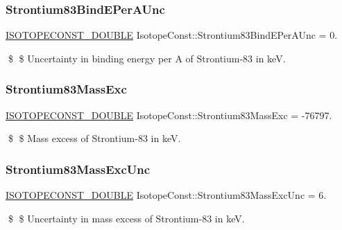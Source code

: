 \subsubsection{\texorpdfstring{Strontium83\+Bind\+E\+Per\+A\+Unc}{Strontium83BindEPerAUnc}}
{\footnotesize\ttfamily \mbox{\hyperlink{group___isotope_const-_macros_ga8f45a7272ce02c0b4c65c44636ed719a}{I\+S\+O\+T\+O\+P\+E\+C\+O\+N\+S\+T\+\_\+\+D\+O\+U\+B\+LE}} Isotope\+Const\+::\+Strontium83\+Bind\+E\+Per\+A\+Unc = 0.}

\$ \$ Uncertainty in binding energy per A of Strontium-\/83 in keV. \mbox{\label{group___isotope_const-_strontium-_sr83_gabb18fc93fcec2e3f7b40bd7cbf25b837}} 
\subsubsection{\texorpdfstring{Strontium83\+Mass\+Exc}{Strontium83MassExc}}
{\footnotesize\ttfamily \mbox{\hyperlink{group___isotope_const-_macros_ga8f45a7272ce02c0b4c65c44636ed719a}{I\+S\+O\+T\+O\+P\+E\+C\+O\+N\+S\+T\+\_\+\+D\+O\+U\+B\+LE}} Isotope\+Const\+::\+Strontium83\+Mass\+Exc = -\/76797.}

\$ \$ Mass excess of Strontium-\/83 in keV. \mbox{\label{group___isotope_const-_strontium-_sr83_ga8ad74621b6aee60101d8063dd97f5de3}} 
\subsubsection{\texorpdfstring{Strontium83\+Mass\+Exc\+Unc}{Strontium83MassExcUnc}}
{\footnotesize\ttfamily \mbox{\hyperlink{group___isotope_const-_macros_ga8f45a7272ce02c0b4c65c44636ed719a}{I\+S\+O\+T\+O\+P\+E\+C\+O\+N\+S\+T\+\_\+\+D\+O\+U\+B\+LE}} Isotope\+Const\+::\+Strontium83\+Mass\+Exc\+Unc = 6.}

\$ \$ Uncertainty in mass excess of Strontium-\/83 in keV. \mbox{\label{group___isotope_const-_strontium-_sr83_gaf5589327a61af9c3742ae369a4f401e4}} 
